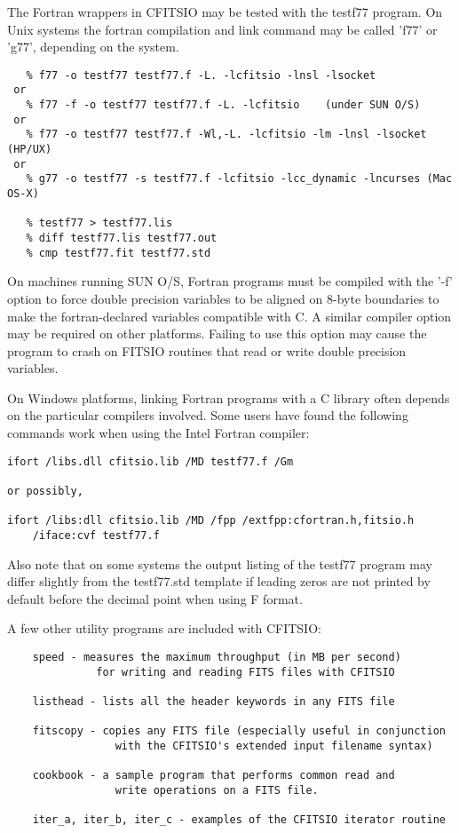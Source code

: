\documentclass[11pt]{book}
\begin{document}
The Fortran wrappers in CFITSIO may be tested with the testf77
program.  On Unix systems the fortran compilation and link command
may be called 'f77' or 'g77', depending on the system.

\begin{verbatim}
   % f77 -o testf77 testf77.f -L. -lcfitsio -lnsl -lsocket
 or
   % f77 -f -o testf77 testf77.f -L. -lcfitsio    (under SUN O/S)
 or
   % f77 -o testf77 testf77.f -Wl,-L. -lcfitsio -lm -lnsl -lsocket (HP/UX)
 or
   % g77 -o testf77 -s testf77.f -lcfitsio -lcc_dynamic -lncurses (Mac OS-X)

   % testf77 > testf77.lis
   % diff testf77.lis testf77.out
   % cmp testf77.fit testf77.std
\end{verbatim}
On machines running SUN O/S, Fortran programs must be compiled with the
'-f' option to force double precision variables to be aligned on 8-byte
boundaries to make the fortran-declared variables compatible with C.  A
similar compiler option may be required on other platforms.  Failing to
use this option may cause the program to crash on FITSIO routines that
read or write double precision variables.

On Windows platforms, linking Fortran programs with a C library
often depends on the particular compilers involved.  Some users have
found the following commands work when using the Intel Fortran compiler:

\begin{verbatim}
ifort /libs.dll cfitsio.lib /MD testf77.f /Gm

or possibly,

ifort /libs:dll cfitsio.lib /MD /fpp /extfpp:cfortran.h,fitsio.h
    /iface:cvf testf77.f
\end{verbatim}
Also note that on some systems the output listing of the testf77
program may differ slightly from the testf77.std template if leading
zeros are not printed by default before the decimal point when using F
format.

A few other utility  programs are included with CFITSIO:

\begin{verbatim}
    speed - measures the maximum throughput (in MB per second)
              for writing and reading FITS files with CFITSIO

    listhead - lists all the header keywords in any FITS file

    fitscopy - copies any FITS file (especially useful in conjunction
                 with the CFITSIO's extended input filename syntax)

    cookbook - a sample program that performs common read and
                 write operations on a FITS file.

    iter_a, iter_b, iter_c - examples of the CFITSIO iterator routine
\end{verbatim}
\end{document}
